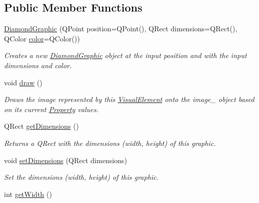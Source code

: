\subsection*{Public Member Functions}
\begin{DoxyCompactItemize}
\item 
\hyperlink{class_picto_1_1_diamond_graphic_a105a5cd6470ee90c77f6e95e7fc2fddb}{Diamond\-Graphic} (Q\-Point position=Q\-Point(), Q\-Rect dimensions=Q\-Rect(), Q\-Color \hyperlink{struct_picto_1_1_visual_element_a45c3042c969717eb2ab60373369c7de7}{color}=Q\-Color())
\begin{DoxyCompactList}\small\item\em Creates a new \hyperlink{class_picto_1_1_diamond_graphic}{Diamond\-Graphic} object at the input position and with the input dimensions and color. \end{DoxyCompactList}\item 
\hypertarget{class_picto_1_1_diamond_graphic_a6311d8315509485a085887567398860e}{void \hyperlink{class_picto_1_1_diamond_graphic_a6311d8315509485a085887567398860e}{draw} ()}\label{class_picto_1_1_diamond_graphic_a6311d8315509485a085887567398860e}

\begin{DoxyCompactList}\small\item\em Draws the image represented by this \hyperlink{struct_picto_1_1_visual_element}{Visual\-Element} onto the image\-\_\- object based on its current \hyperlink{class_picto_1_1_property}{Property} values. \end{DoxyCompactList}\item 
Q\-Rect \hyperlink{class_picto_1_1_diamond_graphic_a1e1beddff08b886e37f40cbfb041d5af}{get\-Dimensions} ()
\begin{DoxyCompactList}\small\item\em Returns a Q\-Rect with the dimensions (width, height) of this graphic. \end{DoxyCompactList}\item 
void \hyperlink{class_picto_1_1_diamond_graphic_a8ff7d3571e3508fb0714b126a613b9f5}{set\-Dimensions} (Q\-Rect dimensions)
\begin{DoxyCompactList}\small\item\em Set the dimensions (width, height) of this graphic. \end{DoxyCompactList}\item 
\hypertarget{class_picto_1_1_diamond_graphic_a14e914ef348387d38f9a776a9dd9bbd7}{int \hyperlink{class_picto_1_1_diamond_graphic_a14e914ef348387d38f9a776a9dd9bbd7}{get\-Width} ()}\label{class_picto_1_1_diamond_graphic_a14e914ef348387d38f9a776a9dd9bbd7}


\end{DoxyCompactItemize}
